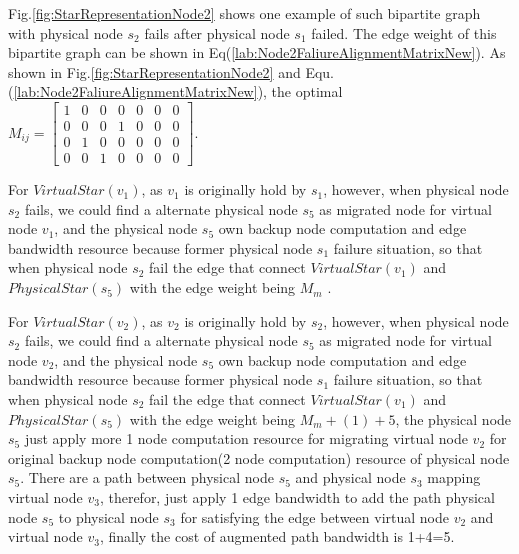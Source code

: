 Fig.\ref{fig:StarRepresentationNode2} shows one example of such  bipartite graph with physical node $s_2$ fails after physical node $s_1$ failed. The edge weight of this   bipartite graph can be shown in  Eq(\ref{lab:Node2FaliureAlignmentMatrixNew}).
As shown in Fig.\ref{fig:StarRepresentationNode2} and Equ.(\ref{lab:Node2FaliureAlignmentMatrixNew}), the optimal $M_{ij}=\left[ {\begin{array}{*{20}{c}}
1&0&0&0&0&0&0\\
0&0&0&1&0&0&0\\
0&1&0&0&0&0&0\\
0&0&1&0&0&0&0
\end{array}} \right]$.




For $VirtualStar(v_1)$, as $v_1$ is originally hold by $s_1$, however, when physical node $s_2$ fails, we could find a alternate physical node $s_5$ as migrated node for virtual node $v_1$, and the physical node $s_5$ own backup node computation and edge bandwidth resource because former physical node $s_1$ failure situation, so that when physical node $s_2$ fail the edge that connect $VirtualStar(v_1)$ and $PhysicalStar(s_5)$ with the edge weight being $M_m$ .


For $VirtualStar(v_2)$, as $v_2$ is originally hold by $s_2$, however, when physical node $s_2$ fails, we could find a alternate physical node $s_5$ as migrated node for virtual node $v_2$, and the physical node $s_5$ own backup node computation and edge bandwidth resource because former physical node $s_1$ failure situation, so that when physical node $s_2$ fail the edge that connect $VirtualStar(v_1)$ and $PhysicalStar(s_5)$ with the edge weight being $M_m+(1)+5$, the physical node $s_5$ just apply more 1 node computation resource for migrating virtual node $v_2$ for original backup node computation(2 node computation) resource of physical node $s_5$. There are a path between physical node $s_5$ and physical node $s_3$ mapping virtual node $v_3$, therefor, just apply 1 edge bandwidth to add the path physical node $s_5$ to physical node $s_3$ for satisfying the edge between virtual node $v_2$ and virtual node $v_3$, finally the cost of augmented path bandwidth is 1+4=5.

